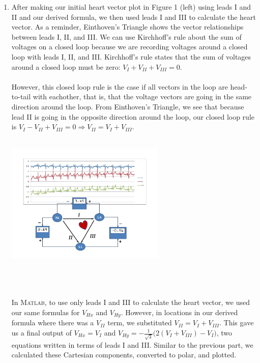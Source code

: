 \documentclass[12pt, a4paper]{article}
\begin{document}
\begin{enumerate}
\begin{enumerate}
\item 
After making our initial heart vector plot in Figure 1 (left) using leads I and II and our derived formula, we then used leads I and III to calculate the heart vector. As a reminder, Einthoven's Triangle shows the vector relationships between leads I, II, and III. We can use Kirchhoff's rule about the sum of voltages on a closed loop because we are recording voltages around a closed loop with leads I, II, and III. Kirchhoff's rule states that the sum of voltages around a closed loop must be zero: $V_{I} + V_{II} + V_{III} = 0$. \\ \\ 
However, this closed loop rule is the case if all vectors in the loop are head-to-tail with eachother, that is, that the voltage vectors are going in the same direction around the loop. From Einthoven's Triangle, we see that because lead II is going in the opposite direction around the loop, our closed loop rule is $V_{I} - V_{II} + V_{III} = 0 \Rightarrow V_{II} = V_{I} + V_{III}$. \\ \\
\begin{minipage}[t]{\linewidth}
\centering
\includegraphics[width=0.6\textwidth]{kirk}
\end{minipage}
\\ \\ \\
In \textsc{Matlab}, to use only leads I and III to calculate the heart vector, we used our same formulas for $V_{Hx}$ and $V_{Hy}$. However, in locations in our derived formula where there was a $V_{II}$ term, we substituted $V_{II} = V_{I} + V_{III}$. This gave us a final output of $V_{Hx} = V_I$ and $V_{Hy} = -\frac{1}{\sqrt{3}}({2(V_{I} + V_{III})- V_I)}$, two equations written in terms of leads I and III. Similar to the previous part, we calculated these Cartesian components, converted to polar, and plotted. \\ \\

\end{enumerate}
\end{enumerate}
\end{document}

